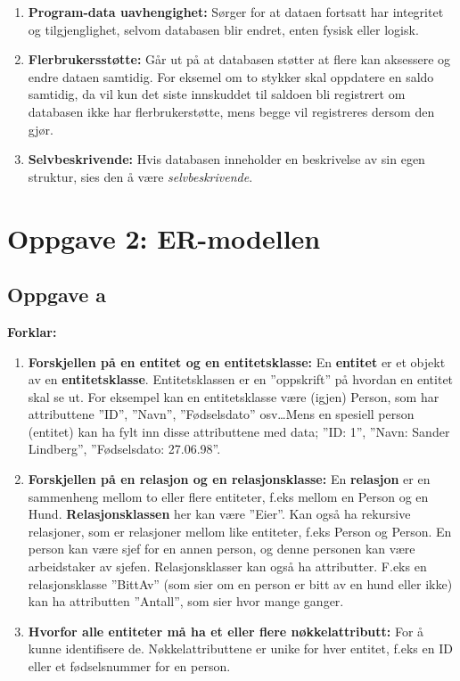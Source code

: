 \documentclass[12pt,a4paper]{article}
\begin{document}
			\begin{enumerate}
				\item \textbf{Program-data uavhengighet:} Sørger for at dataen fortsatt har  integritet og tilgjenglighet, selvom databasen blir endret, enten 								fysisk eller logisk.
				
				\item \textbf{Flerbrukersstøtte:} Går ut på at databasen støtter at flere kan aksessere og endre dataen samtidig. For eksemel om to stykker 									skal oppdatere en saldo samtidig, da vil kun det siste innskuddet til saldoen bli registrert om databasen ikke har flerbrukerstøtte, mens 								begge vil registreres dersom den gjør.  
				
				\item \textbf{Selvbeskrivende:} Hvis databasen inneholder en beskrivelse av sin egen struktur, sies den å være \textit{selvbeskrivende}. 
			\end{enumerate}
			
			
	\section{Oppgave 2: ER-modellen}	
		\subsection{Oppgave a}		
			\textbf{Forklar:}
			\begin{enumerate}
				\item \textbf{Forskjellen på en entitet og en entitetsklasse:} En \textbf{entitet} er et objekt av en \textbf{entitetsklasse}. Entitetsklassen er en 								''oppskrift'' på hvordan en entitet skal se ut. For eksempel kan en entitetsklasse være (igjen) Person, som har attributtene ''ID'', ''Navn'', 								''Fødselsdato'' osv\dots Mens en spesiell person (entitet) kan ha fylt inn disse attributtene med data; ''ID: 1'', ''Navn: Sander Lindberg'', 								''Fødselsdato: 27.06.98''.
				
				\item \textbf{Forskjellen på en relasjon og en relasjonsklasse:} En \textbf{relasjon} er en sammenheng mellom to eller flere entiteter, f.eks mellom 							en Person og en Hund. \textbf{Relasjonsklassen} her kan være ''Eier''. Kan også ha rekursive relasjoner, som er relasjoner mellom like 									entiteter, f.eks	Person	og Person. En person kan være sjef for en annen person, og denne personen kan være arbeidstaker av sjefen. 									Relasjonsklasser kan også ha attributter. F.eks en relasjonsklasse ''BittAv'' (som sier om en person er bitt av en hund eller ikke) kan ha 									attributten ''Antall'', som sier hvor mange ganger.
				
				\item \textbf{Hvorfor alle entiteter må ha et eller flere nøkkelattributt:} For å kunne identifisere de. Nøkkelattributtene er unike for hver entitet, 								f.eks en ID eller et fødselsnummer for en person.
				
			\end{enumerate}
			
\end{document}
